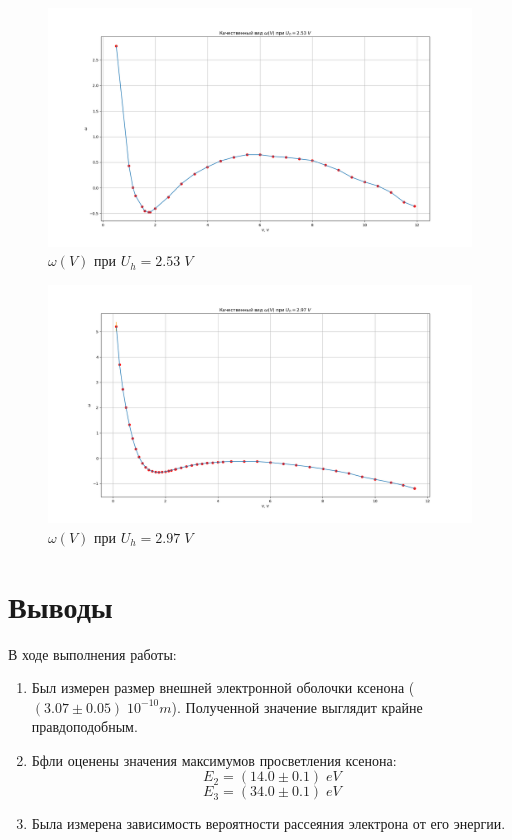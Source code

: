 \documentclass{article}
\begin{document}
\begin{figure}[H]
	\centering
	\includegraphics[width=\textwidth]{omega2.53.png}
	\caption{\(\omega\left(V\right)\) при \(U_h = 2.53\;V\)}
\end{figure}
\begin{figure}[H]
	\centering
	\includegraphics[width=\textwidth]{omega2.97.png}
	\caption{\(\omega\left(V\right)\) при \(U_h = 2.97\;V\)}
\end{figure}

\section{Выводы}
В ходе выполнения работы:
\begin{enumerate}
	\item Был измерен размер внешней электронной оболочки ксенона 
(\((3.07 \pm 0.05)\;10^{-10}m\)). Полученной значение выглядит крайне правдоподобным.
	\item Бфли оценены значения максимумов просветления ксенона:
		\[E_2 = (14.0 \pm 0.1)\;eV\]
		\[E_3 = (34.0 \pm 0.1)\;eV\]
	\item Была измерена зависимость вероятности рассеяния электрона от его энергии.
\end{enumerate}
\end{document}
